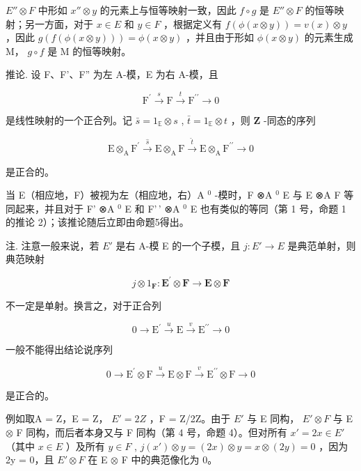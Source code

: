 \(E'' \otimes F\) 中形如 \(x'' \otimes y\) 的元素上与恒等映射一致，因此 \(f \circ g\) 是 \(E'' \otimes F\) 的恒等映射；另一方面，对于 \(x \in E\) 和 \(y \in F\) ，根据定义有 \(f(\phi(x \otimes y)) = v(x) \otimes y\) ，因此 \(g(f(\phi(x \otimes y))) = \phi(x \otimes y)\) ，并且由于形如 \(\phi(x \otimes y)\) 的元素生成 M， \(g \circ f\) 是 M 的恒等映射。

推论. 设 F、F'、F'' 为左 A-模，E 为右 A-模，且

\[
\mathrm{F} ^ {\prime} \stackrel {s} {\longrightarrow} \mathrm{F} \stackrel {t} {\longrightarrow} \mathrm{F} ^ {\prime \prime} \longrightarrow 0\tag{16}
\]

是线性映射的一个正合列。记 \(\bar{s} = 1_{\mathbb{E}} \otimes s\) , \(\bar{t} = 1_{\mathbb{E}} \otimes t\) ，则 \(\mathbf{Z}\) -同态的序列

\[
\mathrm{E} \otimes_ {\mathrm{A}} \mathrm{F} ^ {\prime} \stackrel {\hat {s}} {\longrightarrow} \mathrm{E} \otimes_ {\mathrm{A}} \mathrm{F} \stackrel {\hat {t}} {\longrightarrow} \mathrm{E} \otimes_ {\mathrm{A}} \mathrm{F} ^ {\prime \prime} \longrightarrow 0\tag{17}
\]

是正合的。

当 E（相应地，F）被视为左（相应地，右）A \(^{0}\) -模时，F ⊗A \(^{0}\) E 与 E ⊗A F 等同起来，并且对于 F' ⊗A \(^{0}\) E 和 F'\,' ⊗A \(^{0}\) E 也有类似的等同（第 1 号，命题 1 的推论 2）；该推论随后立即由命题5得出。

注. 注意一般来说，若 \(E'\) 是右 A-模 E 的一个子模，且 \(j:E'\to E\) 是典范单射，则典范映射

\[
j \otimes 1 _ {\mathbf {F}}: \mathbf {E} ^ {\prime} \otimes \mathbf {F} \rightarrow \mathbf {E} \otimes \mathbf {F}
\]

不一定是单射。换言之，对于正合列

\[
0 \longrightarrow \mathrm{E} ^ {\prime} \stackrel {u} {\longrightarrow} \mathrm{E} \stackrel {v} {\longrightarrow} \mathrm{E} ^ {\prime \prime} \longrightarrow 0\tag{18}
\]

一般不能得出结论说序列

\[
0 \longrightarrow \mathrm{E} ^ {\prime} \otimes \mathrm{F} \stackrel {u} {\longrightarrow} \mathrm{E} \otimes \mathrm{F} \stackrel {v} {\longrightarrow} \mathrm{E} ^ {\prime \prime} \otimes \mathrm{F} \longrightarrow 0\tag{19}
\]

是正合的。

例如取A = Z，E = Z， \(E' = 2Z\) ，F = Z/2Z。由于 \(E'\) 与 E 同构， \(E' \otimes F\) 与 E \(\otimes\) F 同构，而后者本身又与 F 同构（第 4 号，命题 4）。但对所有 \(x' = 2x \in E'\) （其中 \(x \in E\) ）及所有 \(y \in F\) , \(j(x') \otimes y = (2x) \otimes y = x \otimes (2y) = 0\) ，因为 2y = 0，且 \(E' \otimes F\) 在 E \(\otimes\) F 中的典范像化为 0。

